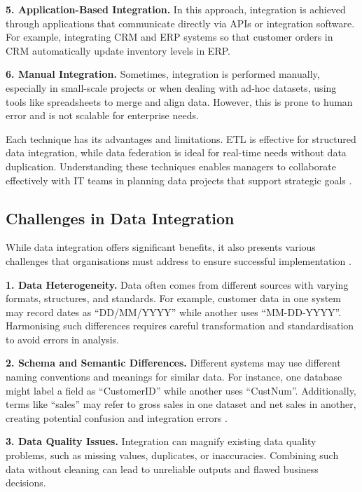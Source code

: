\textbf{5. Application-Based Integration.}  
In this approach, integration is achieved through applications that communicate directly via APIs or integration software. For example, integrating CRM and ERP systems so that customer orders in CRM automatically update inventory levels in ERP.

\textbf{6. Manual Integration.}  
Sometimes, integration is performed manually, especially in small-scale projects or when dealing with ad-hoc datasets, using tools like spreadsheets to merge and align data. However, this is prone to human error and is not scalable for enterprise needs.

Each technique has its advantages and limitations. ETL is effective for structured data integration, while data federation is ideal for real-time needs without data duplication. Understanding these techniques enables managers to collaborate effectively with IT teams in planning data projects that support strategic goals \cite{hasselbring2000information}.

\subsection{Challenges in Data Integration}

While data integration offers significant benefits, it also presents various challenges that organisations must address to ensure successful implementation \cite{alexe2006cleaning}.

\textbf{1. Data Heterogeneity.}  
Data often comes from different sources with varying formats, structures, and standards. For example, customer data in one system may record dates as “DD/MM/YYYY” while another uses “MM-DD-YYYY”. Harmonising such differences requires careful transformation and standardisation to avoid errors in analysis.

\textbf{2. Schema and Semantic Differences.}  
Different systems may use different naming conventions and meanings for similar data. For instance, one database might label a field as “CustomerID” while another uses “CustNum”. Additionally, terms like “sales” may refer to gross sales in one dataset and net sales in another, creating potential confusion and integration errors \cite{doan2003reconciling}.

\textbf{3. Data Quality Issues.}  
Integration can magnify existing data quality problems, such as missing values, duplicates, or inaccuracies. Combining such data without cleaning can lead to unreliable outputs and flawed business decisions.

